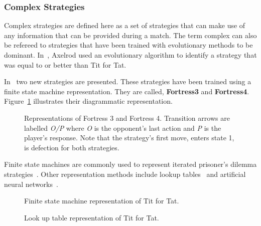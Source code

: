 \documentclass{article}
\begin{document}
\subsubsection{Complex Strategies}

Complex strategies are defined here as a set of strategies that can make use of any
information that can be provided during a match. The term complex can also be
refereed to strategies that have been trained with evolutionary methods to 
be dominant. In~\cite{Axelrod1987}, Axelrod used an evolutionary algorithm to 
identify a strategy that was equal to or better than Tit for Tat.

In~\cite{Ashlock2006b} two new strategies are presented. These strategies have
been trained using a finite state machine representation. They are called,
\textbf{Fortress3} and \textbf{Fortress4}. Figure~\ref{fig:fortress3_and_4}
illustrates their diagrammatic representation.

\begin{figure}[!hbtp]
\centering
    \begin{subfigure}{.4\textwidth}
        
    \end{subfigure}
    \begin{subfigure}{.4\textwidth}\centering
        
     \end{subfigure}
     \caption{Representations of Fortress 3 and Fortress 4. Transition arrows are 
     labelled \textit{O/P} where \textit{O} is the opponent’s last action and \textit{P}
     is the player’s response. Note that the strategy’s first move, enters state 1, 
     is defection for both strategies.}
     \label{fig:fortress3_and_4}
\end{figure}

Finite state machines are commonly used to represent iterated prisoner's
dilemma strategies~\cite{Miller1996, Rubinstein1986}. Other representation
methods include lookup tables~\cite{Axelrod1987, Lindgren1994} and 
artificial neural networks~\cite{Fogel1996, Lee2015}.


\begin{figure}[!hbtp]
    \centering
    
    \caption{Finite state machine representation of Tit for Tat.}
    \label{fig:tit_for_tat_fsn}
\end{figure}

\begin{figure}[!hbtp]
    \centering
    
    \caption{Look up table representation of Tit for Tat.}
    \label{fig:tit_for_tat_lu}
\end{figure}
\end{document}
